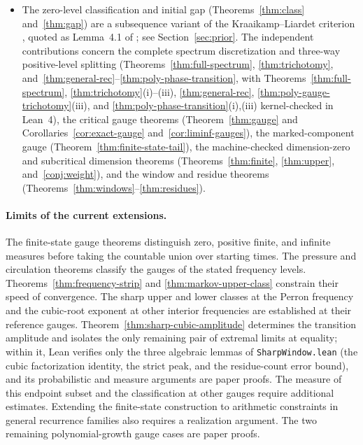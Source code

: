 \documentclass[11pt]{article}
\theoremstyle{definition}
\theoremstyle{remark}
\begin{document}
\begin{itemize}[leftmargin=1.5em]
remains an open problem). It is a metric-theory spin-off; the connection is
that the zero-level classification machinery arose from the $e+\pi$ escape
program \cite{Phase1}.
\item The zero-level classification and initial gap (Theorems~\ref{thm:class}
and~\ref{thm:gap}) are a subsequence variant of the Kraaikamp--Liardet
criterion \cite{KL}, quoted as Lemma~4.1 of \cite{BDS}; see
Section~\ref{sec:prior}. The independent contributions concern the complete spectrum
discretization and three-way positive-level splitting
(Theorems~\ref{thm:full-spectrum}, \ref{thm:trichotomy},
and~\ref{thm:general-rec}--\ref{thm:poly-phase-transition}, with
Theorems~\ref{thm:full-spectrum}, \ref{thm:trichotomy}(i)--(iii),
\ref{thm:general-rec}, \ref{thm:poly-gauge-trichotomy}(iii), and
\ref{thm:poly-phase-transition}(i),(iii) kernel-checked in Lean~4), the critical gauge theorems
(Theorem~\ref{thm:gauge} and Corollaries~\ref{cor:exact-gauge}
and~\ref{cor:liminf-gauges}), the marked-component gauge
(Theorem~\ref{thm:finite-state-tail}), the machine-checked dimension-zero and subcritical dimension theorems
(Theorems~\ref{thm:finite}, \ref{thm:upper}, and~\ref{conj:weight}), and the
window and residue theorems (Theorems~\ref{thm:windows}--\ref{thm:residues}).
\end{itemize}

\paragraph{Limits of the current extensions.}
The finite-state gauge theorems distinguish zero, positive finite, and
infinite measures before taking the countable union over starting times.
The pressure and circulation theorems classify the gauges of the
stated frequency levels. Theorems~\ref{thm:frequency-strip} and
\ref{thm:markov-upper-class} constrain their speed of convergence.
The sharp upper and lower classes at the Perron frequency and
the cubic-root exponent at other interior frequencies are
established at their reference gauges.
Theorem~\ref{thm:sharp-cubic-amplitude} determines the transition
amplitude and isolates the only remaining pair of extremal
limits at equality; within it, Lean verifies only the three
algebraic lemmas of \texttt{SharpWindow.lean} (the cubic
factorization identity, the strict peak, and the residue-count
error bound), and its probabilistic and measure arguments are
paper proofs. The measure of this endpoint subset
and the classification at other gauges require additional estimates. Extending the finite-state construction to
arithmetic constraints in general recurrence families also requires a
realization argument. The two remaining polynomial-growth gauge cases
are paper proofs.
\end{document}
